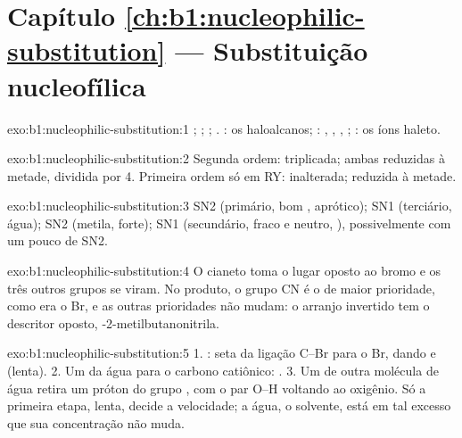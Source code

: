 \section*{Capítulo \ref{ch:b1:nucleophilic-substitution} --- Substituição nucleofílica}

\begin{solution}{exo:b1:nucleophilic-substitution:1}
; ; ;
. : os haloalcanos; :
, , , ; : os íons haleto.
\end{solution}

\begin{solution}{exo:b1:nucleophilic-substitution:2}
Segunda ordem: triplicada; ambas reduzidas à metade, dividida por 4.
Primeira ordem só em RY: inalterada; reduzida à metade.
\end{solution}

\begin{solution}{exo:b1:nucleophilic-substitution:3}
SN2 (primário, bom , aprótico); SN1 (terciário, água); SN2
(metila,  forte);  SN1 (secundário,  fraco
e neutro, ), possivelmente com um pouco de SN2.
\end{solution}

\begin{solution}{exo:b1:nucleophilic-substitution:4}
O cianeto toma o lugar oposto ao bromo e os três outros grupos se viram.
No produto, o grupo CN é o de maior prioridade, como era o Br, e as
outras prioridades não mudam: o arranjo invertido tem o descritor
oposto, -2-metilbutanonitrila.
\end{solution}

\begin{solution}{exo:b1:nucleophilic-substitution:5}
1. : seta da ligação C--Br para o Br, dando  e
 (lenta). 2. Um  da água para o carbono
catiônico: . 3. Um  de outra molécula de
água retira um próton do grupo , com o par O--H voltando ao
oxigênio. Só a primeira etapa, lenta, decide a velocidade; a água, o
solvente, está em tal excesso que sua concentração não muda.
\end{solution}

